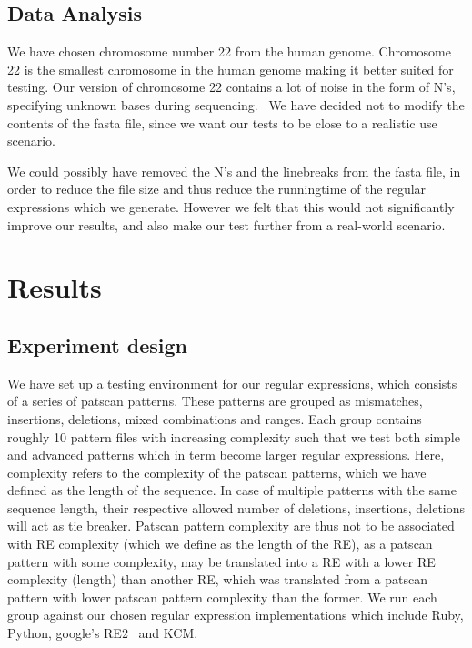 \documentclass[12pt]{article}
\theoremstyle{definition}
\begin{document}
\newpage

\subsection{Data Analysis}

We have chosen chromosome number 22 from the human genome. Chromosome 22 is the smallest chromosome in the human genome making it better suited for testing. Our version of chromosome 22 contains a lot of noise in the form of N's, specifying unknown bases during sequencing.~\cite{human-genome} We have decided not to modify the contents of the fasta file, since we want our tests to be close to a realistic use scenario.

We could possibly have removed the N's and the linebreaks from the fasta file, in order to reduce the file size and thus reduce the runningtime of the regular expressions which we generate. However we felt that this would not significantly improve our results, and also make our test further from a real-world scenario.

\section{Results}

\subsection{Experiment design}

We have set up a testing environment for our regular expressions, which consists of a series of patscan patterns. These patterns are grouped as mismatches, insertions, deletions, mixed combinations and ranges. Each group contains roughly 10 pattern files with increasing complexity such that we test both simple and advanced patterns which in term become larger regular expressions. Here, complexity refers to the complexity of the patscan patterns, which we have defined as the length of the sequence. In case of multiple patterns with the same sequence length, their respective allowed number of deletions, insertions, deletions will act as tie breaker. Patscan pattern complexity are thus not to be associated with RE complexity (which we define as the length of the RE), as a patscan pattern with some complexity, may be translated into a RE with a lower RE complexity (length) than another RE, which was translated from a patscan pattern with lower patscan pattern complexity than the former. We run each group against our chosen regular expression implementations which include Ruby, Python, google's RE2~\cite{re2} and KCM.
 
\end{document}
